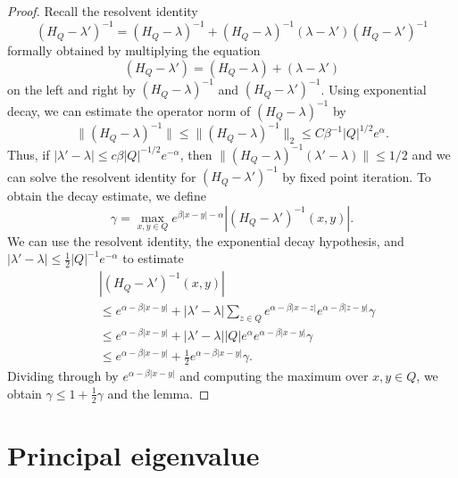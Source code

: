 \documentclass{amsart}
\numberwithin{equation}{section}
\numberwithin{figure}{section}
\begin{document}
\begin{proof}
Recall the resolvent identity
\begin{equation*}
(H_Q - \lambda')^{-1} = (H_Q - \lambda)^{-1} + (H_Q - \lambda)^{-1} (\lambda - \lambda') (H_Q - \lambda')^{-1}
\end{equation*}
formally obtained by multiplying the equation
\begin{equation*}
(H_Q - \lambda') = (H_Q - \lambda) + (\lambda - \lambda')
\end{equation*}
on the left and right by $(H_Q - \lambda)^{-1}$ and $(H_Q - \lambda')^{-1}$.  Using exponential decay, we can estimate the operator norm of $(H_Q - \lambda)^{-1}$ by
\begin{equation*}
\| (H_Q - \lambda)^{-1} \| \leq \| (H_Q - \lambda)^{-1} \|_2 \leq C \beta^{-1} |Q|^{1/2} e^\alpha.
\end{equation*}
Thus, if $|\lambda' - \lambda| \leq c \beta |Q|^{-1/2} e^{-\alpha}$, then $\| (H_Q - \lambda)^{-1} (\lambda' - \lambda) \| \leq 1/2$ and we can solve the resolvent identity for $(H_Q - \lambda')^{-1}$ by fixed point iteration.  To obtain the decay estimate, we define
\begin{equation*}
\gamma = \max_{x,y \in Q} e^{\beta |x-y| - \alpha} |(H_Q - \lambda')^{-1}(x,y)|.
\end{equation*}
We can use the resolvent identity, the exponential decay hypothesis, and $|\lambda' - \lambda| \leq \tfrac12 |Q|^{-1} e^{-\alpha}$ to estimate
\begin{equation*}
\begin{aligned}
& |(H_Q - \lambda')^{-1}(x,y)| \\
& \leq e^{\alpha - \beta |x-y|} + |\lambda' - \lambda| \sum_{z \in Q} e^{\alpha - \beta |x-z|} e^{\alpha - \beta |z-y|} \gamma \\
& \leq e^{\alpha - \beta |x-y|} + |\lambda' - \lambda| |Q| e^\alpha e^{\alpha - \beta |x-y|} \gamma \\
& \leq e^{\alpha - \beta |x-y|} + \tfrac12 e^{\alpha - \beta |x-y|} \gamma.
\end{aligned}
\end{equation*}
Dividing through by $e^{\alpha - \beta |x-y|}$ and computing the maximum over $x, y \in Q$, we obtain $\gamma \leq 1 + \tfrac12 \gamma$ and the lemma.
\end{proof}

\section{Principal eigenvalue}
\end{document}
